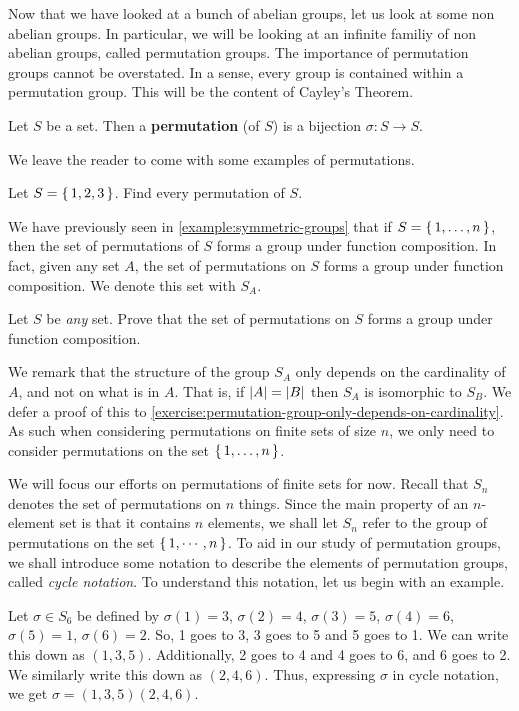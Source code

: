 \documentclass[./main.tex]{subfiles}
\begin{document}
Now that we have looked at a bunch of abelian groups, let us look at some non
abelian groups. In particular, we will be looking at an infinite familiy of non
abelian groups, called permutation groups. The importance of permutation groups
cannot be overstated. In a sense, every group is contained within a permutation
group. This will be the content of Cayley's Theorem. 

\begin{definition}[Permutation]
\label{def:permutation}
    Let $S$ be a set. Then a \textbf{permutation} (of $S$) is a bijection
    $\sigma: S \to S$.
\end{definition}
We leave the reader to come with some examples of permutations. 
\begin{exercise}
    Let $S = \set{1,2,3}$. Find every permutation of $S$.
\end{exercise}

We have previously seen in \cref{example:symmetric-groups} that if $S =
\set{1,\dots,n}$, then the set of permutations of $S$ forms a group under
function composition. In fact, given any set $A$, the set of permutations on $S$
forms a group under function composition. We denote this set with
$S_A$.
\begin{exercise}
    Let $S$ be \emph{any} set. Prove that the set of permutations on $S$ forms a
    group under function composition.
\end{exercise}
We remark that the structure of the group $S_A$ only depends on the cardinality
of $A$, and not on what is in $A$. That is, if $\abs{A} = \abs{B}$ then $S_A$ is
isomorphic to $S_B$. We defer a proof of this to
\cref{exercise:permutation-group-only-depends-on-cardinality}. As such when
considering permutations on finite sets of size $n$, we only need to consider
permutations on the set $\set{1, \dots, n}$.

We will focus our efforts on permutations of finite sets for now. Recall that
$S_n$ denotes the set of permutations on $n$ things. Since the main property of
an $n$-element set is that it contains $n$ elements, we shall let $S_n$ refer to
the group of permutations on the set $\set{1, \cdots, n}$. To aid in our study
of permutation groups, we shall introduce some notation to describe the elements
of permutation groups, called \emph{cycle notation}. To understand this
notation, let us begin with an example.

Let $\sigma \in S_6$ be defined by $\sigma(1) = 3$, $\sigma(2) = 4$, $\sigma(3)
= 5$, $\sigma(4) = 6$, $\sigma(5) = 1$, $\sigma(6) = 2$. So, 1 goes to 3, 3 goes
to 5 and 5 goes to 1. We can write this down as $(1,3,5)$. Additionally, 2 goes
to 4 and 4 goes to 6, and 6 goes to 2. We similarly write this down as
$(2,4,6)$. Thus, expressing $\sigma$ in cycle notation, we get $\sigma =
(1,3,5)(2,4,6)$. 
\end{document}
